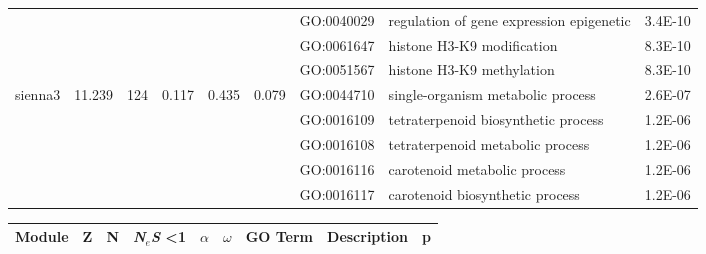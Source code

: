 \begin{landscape}
\begin{table}[ht]
\begin{tabular}{|l|rrrrrlP{5cm}r|}
   &  &  &  &  &  & GO:0040029 & regulation of gene expression epigenetic & 3.4E-10 \\ 
   &  &  &  &  &  & GO:0061647 & histone H3-K9 modification & 8.3E-10 \\ 
   &  &  &  &  &  & GO:0051567 & histone H3-K9 methylation & 8.3E-10 \\ 
\hline  
sienna3 & 11.239 & 124 & 0.117 & 0.435 & 0.079 & GO:0044710 & single-organism metabolic process & 2.6E-07 \\ 
   &  &  &  &  &  & GO:0016109 & tetraterpenoid biosynthetic process & 1.2E-06 \\ 
   &  &  &  &  &  & GO:0016108 & tetraterpenoid metabolic process & 1.2E-06 \\ 
   &  &  &  &  &  & GO:0016116 & carotenoid metabolic process & 1.2E-06 \\ 
   &  &  &  &  &  & GO:0016117 & carotenoid biosynthetic process & 1.2E-06 \\ 
\hline  

\end{tabular}
\end{table}


\begin{table}[ht]
\centering
\begin{tabular}{|l|rrrrrlP{5cm}r|}
  \hline
Module & Z & N & \textit{N$_{e}$S} \textless 1& $\alpha$ & $\omega$ & GO Term & Description & p \\ 
  \hline


\end{tabular}
\end{table}
\end{landscape}
